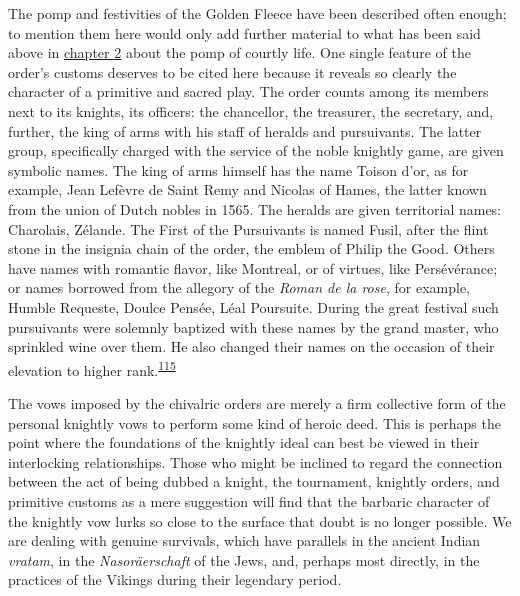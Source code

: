 The pomp and festivities of the Golden Fleece have been described often
enough; to mention them here would only add further material to what has
been said above in
\protect\hyperlink{09_Chapter_Two__THE_CRAVING_FOR_A_M.xhtmlux5cux23page_30}{chapter
2} about the pomp of courtly life. One single feature of the order's
customs deserves to be cited here because it reveals so clearly the
character of a primitive and sacred play. The order counts among its
members next to its knights, its officers: the chancellor, the
treasurer, the secretary, and, further, the king of arms with his staff
of heralds and pursuivants. The latter group, specifically charged with
the service of the noble knightly game, are given symbolic names. The
king of arms himself has the name Toison d'or, as for example, Jean
Lefèvre de Saint Remy and Nicolas of Hames, the latter known from the
union of Dutch nobles in 1565. The heralds are given territorial names:
Charolais, Zélande. The First of the Pursuivants is named Fusil, after
the flint stone in the insignia chain of the order, the emblem of Philip
the Good. Others have names with romantic flavor, like Montreal, or of
virtues, like Persévérance; or names borrowed from the allegory of the
\emph{Roman de la rose}, for example, Humble Requeste, Doulce Pensée,
Léal Poursuite. During the great festival such pursuivants were solemnly
baptized with these names by the grand master, who sprinkled wine over
them.
\protect\hypertarget{10_Chapter_Three__THE_HEROIC_DREAM.xhtmlux5cux23page_97}{}{}He
also changed their names on the occasion of their elevation to higher
rank.\textsuperscript{\protect\hypertarget{10_Chapter_Three__THE_HEROIC_DREAM.xhtmlux5cux23id_1705}{\protect\hyperlink{23_NOTES.xhtmlux5cux23id_1706}{115}}}

The vows imposed by the chivalric orders are merely a firm collective
form of the personal knightly vows to perform some kind of heroic deed.
This is perhaps the point where the foundations of the knightly ideal
can best be viewed in their interlocking relationships. Those who might
be inclined to regard the connection between the act of being dubbed a
knight, the tournament, knightly orders, and primitive customs as a mere
suggestion will find that the barbaric character of the knightly vow
lurks so close to the surface that doubt is no longer possible. We are
dealing with genuine survivals, which have parallels in the ancient
Indian \emph{vratam}, in the \emph{Nasoräerschaft} of the Jews, and,
perhaps most directly, in the practices of the Vikings during their
legendary period.

